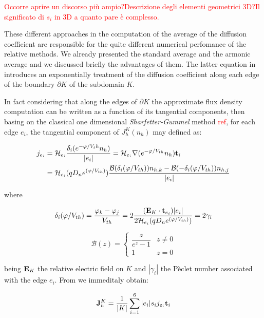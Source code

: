 \textcolor{red}{Occorre aprire un discorso pi\`u ampio?Descrizione degli elementi geometrici 3D?Il significato di $s_i$ in 3D a quanto pare \`e complesso.}


These different approaches in the computation of the average of the diffusion coefficient are responsible for the quite different numerical perfomance of the relative methods.
We already presented the standard average and the armonic average and we discussed briefly the advantages of them. 
The latter equation in  introduces an exponentially treatment of the diffusion coefficient along each edge of the boundary $\partial K$ of the subdomain $K$. 

In fact considering that along the edges of $\partial K$ the approximate flux density computation can be written as a function of its tangential components, then basing on the classical one dimensional \textit{Sharfetter-Gummel} method \textcolor{red}{ref}, for each edge $e_i$, the tangential component of $J_h^K(n_h)$ may defined as:

\begin{align*}
j_{e_i}  & =   \mathcal{H}_{e_i} \dfrac{\delta_i(e^{-\varphi /V_th}n_h)}{|e_i|} = \mathcal{H}_{e_i} \nabla (e^{-\varphi / V_{th}}n_h) \mathbf{t}_i \\
& =  \mathcal{H}_{e_i}(qD_n e^{(\varphi/V_{th})}) \dfrac{\mathcal{B}(\delta_i(\varphi / V_{th}))n_{h,k} -  \mathcal{B}(-\delta_i(\varphi / V_{th}))n_{h,j}}{|e_i|}
\end{align*}

where 

\begin{equation}
\delta_i(\varphi / V_{th}) = \dfrac{\varphi_k - \varphi_j}{V_{th}} = 2 \dfrac{(\mathbf{E}_K\cdot \mathbf{t}_{e_i}) |e_i|}{2\mathcal{H}_{e_i}(qD_n e^{(\varphi/V_{th})}) } = 2 \gamma_i
\end{equation}

\begin{equation}
\mathcal{B}(z) = \left\{ \begin{array}{cl}
\dfrac{z}{e^z-1} & z \neq 0
\\
1 & z = 0
\end{array}
\right.
\end{equation}

being $\mathbf{E}_K$ the relative electric field on $K$ and $|\gamma_i|$ the P\`eclet number associated with the edge $e_i$. 
From  we immeditaly obtain:

\begin{equation}
\label{eq: exp fitted flux}
\mathbf{J}_h^K = \dfrac{1}{|K|}\sum_{i=1}^6 |e_i| s_i j_{e_i} \mathbf{t}_i 
\end{equation}

